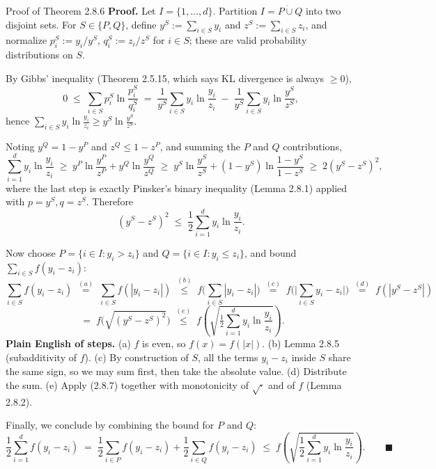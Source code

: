 \documentclass[aspectratio=169,10pt]{beamer}
\begin{document}
\begin{frame}[allowframebreaks]{Proof of Theorem 2.8.6}
  \textbf{Proof.} Let $I=\{1,\ldots,d\}$. Partition $I = P \dot\cup Q$ into
  two disjoint sets. For $S \in \{P,Q\}$, define $y^S := \sum_{i\in S} y_i$
  and $z^S := \sum_{i\in S} z_i$, and normalize $p_i^S := y_i/y^S$,
  $q_i^S := z_i/z^S$ for $i \in S$; these are valid probability
  distributions on $S$.

  By Gibbs' inequality (Theorem 2.5.15, which says KL divergence is always
  $\ge 0$),
  \[
    0 \;\le\; \sum_{i\in S} p_i^S \ln\frac{p_i^S}{q_i^S}
    \;=\; \frac{1}{y^S}\sum_{i\in S} y_i \ln\frac{y_i}{z_i}
    \;-\; \frac{1}{y^S}\sum_{i\in S} y_i \ln\frac{y^S}{z^S},
  \]
  hence $\sum_{i\in S} y_i \ln\frac{y_i}{z_i} \ge y^S \ln\frac{y^S}{z^S}$.

  \framebreak

  Noting $y^Q = 1-y^P$ and $z^Q \le 1-z^P$, and summing the $P$ and $Q$
  contributions,
  \[
    \sum_{i=1}^d y_i \ln\frac{y_i}{z_i} \;\ge\;
    y^P\ln\frac{y^P}{z^P} + y^Q\ln\frac{y^Q}{z^Q}
    \;\ge\; y^S\ln\frac{y^S}{z^S} + (1-y^S)\ln\frac{1-y^S}{1-z^S}
    \;\ge\; 2(y^S-z^S)^2,
  \]
  where the last step is exactly Pinsker's binary inequality (Lemma 2.8.1)
  applied with $p=y^S,q=z^S$. Therefore
  \begin{equation}
    (y^S - z^S)^2 \;\le\; \frac12 \sum_{i=1}^d y_i \ln\frac{y_i}{z_i}. \tag{2.8.7}
  \end{equation}

  \framebreak

  Now choose $P = \{i\in I: y_i > z_i\}$ and $Q = \{i \in I : y_i \le z_i\}$,
  and bound $\sum_{i\in S} f(y_i-z_i)$:
  \[
    \sum_{i\in S} f(y_i-z_i)
    \;\overset{(a)}{=}\; \sum_{i\in S} f(|y_i-z_i|)
    \;\overset{(b)}{\le}\; f\Big(\sum_{i\in S}|y_i-z_i|\Big)
    \;\overset{(c)}{=}\; f\Big(\Big|\sum_{i\in S}y_i-z_i\Big|\Big)
    \;\overset{(d)}{=}\; f(|y^S-z^S|)
  \]
  \[
    \;=\; f\big(\sqrt{(y^S-z^S)^2}\big) \;\overset{(e)}{\le}\;
    f\!\left(\sqrt{\tfrac12\sum_{i=1}^d y_i\ln\frac{y_i}{z_i}}\right).
  \]
  \textbf{Plain English of steps.} (a) $f$ is even, so $f(x)=f(|x|)$.
  (b) Lemma 2.8.5 (subadditivity of $f$). (c) By construction of $S$, all
  the terms $y_i-z_i$ inside $S$ share the same sign, so we may sum first,
  then take the absolute value. (d) Distribute the sum. (e) Apply (2.8.7)
  together with monotonicity of $\sqrt{\cdot}$ and of $f$ (Lemma 2.8.2).

  \framebreak

  Finally, we conclude by combining the bound for $P$ and $Q$:
  \[
    \frac12 \sum_{i=1}^d f(y_i-z_i) \;=\; \frac12\sum_{i\in P} f(y_i-z_i) +
    \frac12\sum_{i\in Q} f(y_i-z_i)
    \;\le\; f\!\left(\sqrt{\frac12\sum_{i=1}^d y_i\ln\frac{y_i}{z_i}}\right).
    \qquad \blacksquare
  \]
\end{frame}
\end{document}
